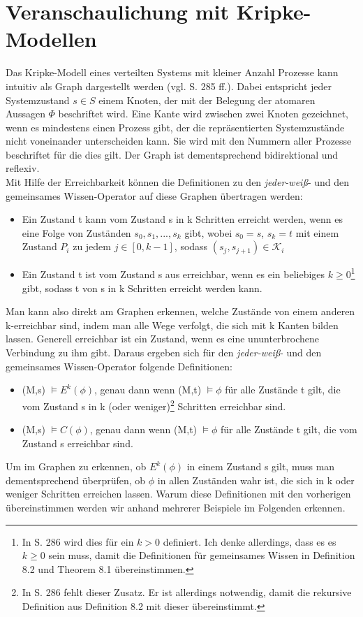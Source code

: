 \section{Veranschaulichung mit Kripke-Modellen}
\label{Kripke-Modelle}
Das Kripke-Modell eines verteilten Systems mit kleiner Anzahl Prozesse kann intuitiv als Graph dargestellt werden (vgl. \cite{kshemkalyani2011distributed} S. 285 ff.). Dabei entspricht jeder Systemzustand $s\in S$ einem Knoten, der mit der Belegung der atomaren Aussagen $\Phi$ beschriftet wird. Eine Kante wird zwischen zwei Knoten gezeichnet, wenn es mindestens einen Prozess gibt, der die repräsentierten Systemzustände nicht voneinander unterscheiden kann. Sie wird mit den Nummern aller Prozesse beschriftet für die dies gilt.
Der Graph ist dementsprechend bidirektional und reflexiv.\\
Mit Hilfe der Erreichbarkeit können die Definitionen zu den \textit{jeder-weiß}- und den gemeinsames Wissen-Operator auf diese Graphen übertragen werden:
\begin{itemize}
	\item Ein Zustand t kann vom Zustand s in k Schritten erreicht werden, wenn es eine Folge von Zuständen $s_0,s_1,...,s_k$ gibt, wobei $s_0 = s$, $s_k = t$ mit einem Zustand $P_i$ zu jedem $j\in [ 0,k-1 ]$, sodass $(s_j,s_{j+1})\in \mathcal{K}_i$
	\item Ein Zustand t ist vom Zustand s aus erreichbar, wenn es ein beliebiges $k \ge 0$\footnote{In \cite{kshemkalyani2011distributed} S. 286 wird dies für ein $k > 0$ definiert. Ich denke allerdings, dass es es $k \ge 0$ sein muss, damit die Definitionen für gemeinsames Wissen in Definition 8.2 und Theorem 8.1 übereinstimmen. } gibt, sodass t von s in k Schritten erreicht werden kann.
\end{itemize}
Man kann also direkt am Graphen erkennen, welche Zustände von einem anderen k-erreichbar sind, indem man alle Wege verfolgt, die sich mit k Kanten bilden lassen.
Generell erreichbar ist ein Zustand, wenn es eine ununterbrochene Verbindung zu ihm gibt.
Daraus ergeben sich für den \textit{jeder-weiß}- und den gemeinsames Wissen-Operator folgende Definitionen:
\begin{itemize}
	\item (M,s) $\vDash E^{k}(\phi)$, genau dann wenn (M,t) $\vDash \phi$ für alle Zustände t gilt, die vom Zustand s in k (oder weniger)\footnote{In \cite{kshemkalyani2011distributed} S. 286 fehlt dieser Zusatz. Er ist allerdings notwendig, damit die rekursive Definition aus Definition 8.2 mit dieser übereinstimmt.} Schritten erreichbar sind.
	\item (M,s) $\vDash C(\phi)$, genau dann wenn (M,t) $\vDash \phi$ für alle Zustände t gilt, die vom Zustand s erreichbar sind.
\end{itemize}
Um im Graphen zu erkennen, ob $E^{k}(\phi)$ in einem Zustand s gilt, muss man dementsprechend überprüfen, ob $\phi$ in allen Zuständen wahr ist, die sich in k oder weniger Schritten erreichen lassen. 
Warum diese Definitionen mit den vorherigen übereinstimmen werden wir anhand mehrerer Beispiele im Folgenden erkennen.

